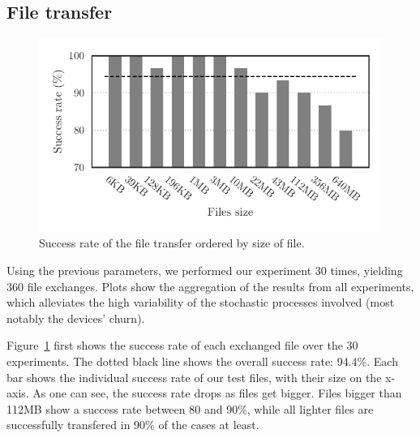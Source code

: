 
\subsection{File transfer}
\label{sub:file_transfer}

\begin{figure}[t]
  \centering
  \includegraphics[width=0.8\columnwidth]{figures/completion_vs_size.pdf}

  \caption{\label{fig:completion_vs_size}
  Success rate of the file transfer ordered by size of file.}
\end{figure}


Using the previous parameters, we performed our experiment 30 times, yielding 360 file exchanges. Plots show the aggregation of the results from all experiments, which alleviates the high variability of the stochastic processes involved (most notably the devices' churn).

Figure~\ref{fig:completion_vs_size} first shows the success rate of each exchanged file over the 30 experiments.
The dotted black line shows the overall success rate: 94.4\%. 
Each bar shows the individual success rate of our test files, with their size on the x-axis.
As one can see, the success rate drops as files get bigger.
Files bigger than 112MB show a success rate between 80 and 90\%, while all lighter files are successfully transfered in 90\% of the cases at least.





